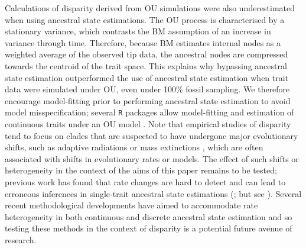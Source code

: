 \documentclass[11pt, a4paper]{article}
\newcommand{\ase}{ancestral state estimation }
\begin{document}
Calculations of disparity derived from OU simulations were also underestimated when using ancestral state estimations.
The OU process is characterised by a stationary variance, which contrasts the BM assumption of an increase in variance through time.
Therefore, because BM estimates internal nodes as a weighted average of the observed tip data, the ancestral nodes are compressed towards the centroid of the trait space.
This explains why bypassing \ase outperformed the use of ancestral state estimation when trait data were simulated under OU, even under 100\% fossil sampling.
We therefore encourage model-fitting prior to performing \ase to avoid model misspecification; several \texttt{R} packages allow model-fitting and estimation of continuous traits under an OU model \citep{revell2012phytools,pennell2014geiger,clavel2015mvmorph}. %
Note that empirical studies of disparity tend to focus on clades that are suspected to have undergone major evolutionary shifts, such as adaptive radiations \citep{ruta2013decoupling,stroud2016ecological} or mass extinctions \citep{bapst2012graptoloid,halliday2016eutherian,liu2024heterogeneous}, which are often associated with shifts in evolutionary rates or models. 
The effect of such shifts or heterogeneity in the context of the aims of this paper remains to be tested; previous work has found that rate changes are hard to detect and can lead to erroneous inferences in single-trait ancestral state estimations (\citealp{king2015ancestral,chira2016impact, harrington2017rate}; but see \citealp{reyes2018testing, muniz2025robustness}).
Several recent methodological developments have aimed to accommodate rate heterogeneity in both continuous \citep{elliot2014inferring,smaers2016multiple, castiglione2020ancestral} and discrete ancestral state estimation \citep{boyko2021generalized,revell2024discrete} and so testing these methods in the context of disparity is a potential future avenue of research.





\end{document}
